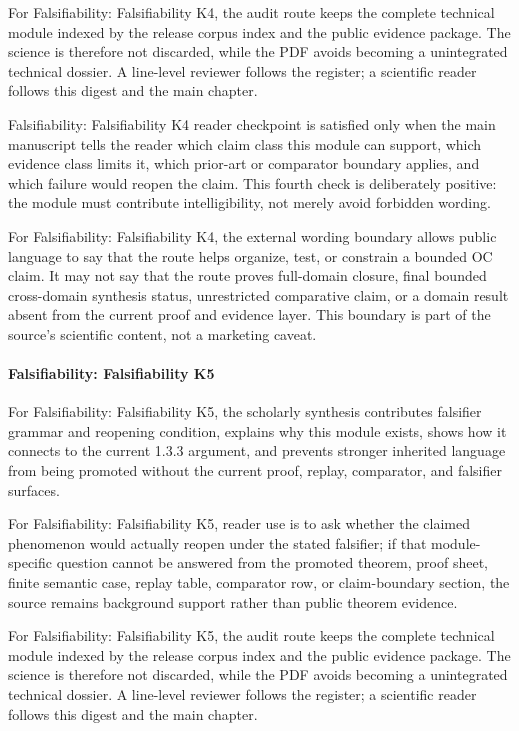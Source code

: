 For Falsifiability: Falsifiability K4, the audit route keeps the complete technical module indexed by the release corpus index and the public evidence package. The science is therefore not discarded, while the PDF avoids becoming a unintegrated technical dossier. A line-level reviewer follows the register; a scientific reader follows this digest and the main chapter.


Falsifiability: Falsifiability K4 reader checkpoint is satisfied only when the main manuscript tells the reader which claim class this module can support, which evidence class limits it, which prior-art or comparator boundary applies, and which failure would reopen the claim. This fourth check is deliberately positive: the module must contribute intelligibility, not merely avoid forbidden wording.


For Falsifiability: Falsifiability K4, the external wording boundary allows public language to say that the route helps organize, test, or constrain a bounded OC claim. It may not say that the route proves full-domain closure, final bounded cross-domain synthesis status, unrestricted comparative claim, or a domain result absent from the current proof and evidence layer. This boundary is part of the source's scientific content, not a marketing caveat.


\paragraph{Falsifiability: Falsifiability K5}

For Falsifiability: Falsifiability K5, the scholarly synthesis contributes falsifier grammar and reopening condition, explains why this module exists, shows how it connects to the current 1.3.3 argument, and prevents stronger inherited language from being promoted without the current proof, replay, comparator, and falsifier surfaces.


For Falsifiability: Falsifiability K5, reader use is to ask whether the claimed phenomenon would actually reopen under the stated falsifier; if that module-specific question cannot be answered from the promoted theorem, proof sheet, finite semantic case, replay table, comparator row, or claim-boundary section, the source remains background support rather than public theorem evidence.


For Falsifiability: Falsifiability K5, the audit route keeps the complete technical module indexed by the release corpus index and the public evidence package. The science is therefore not discarded, while the PDF avoids becoming a unintegrated technical dossier. A line-level reviewer follows the register; a scientific reader follows this digest and the main chapter.


